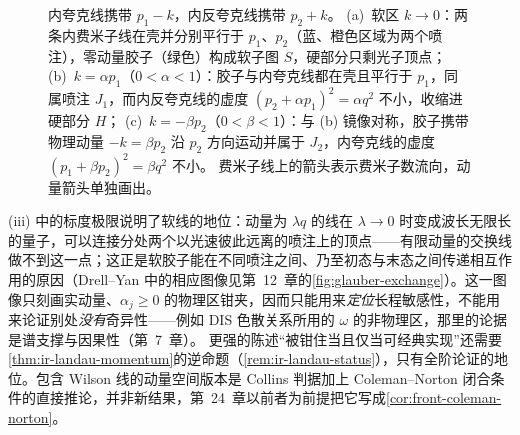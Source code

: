 \begin{figure}[htbp]
{内夸克线携带 $p_1-k$，内反夸克线携带 $p_2+k$。
(a)~软区 $k\to0$：两条内费米子线在壳并分别平行于 $p_1$、$p_2$（蓝、橙色区域为两个喷注），零动量胶子（绿色）构成软子图 $S$，硬部分只剩光子顶点；
(b)~$k=\alpha p_1$（$0<\alpha<1$）：胶子与内夸克线都在壳且平行于 $p_1$，同属喷注 $J_1$，而内反夸克线的虚度 $(p_2+\alpha p_1)^2=\alpha q^2$ 不小，收缩进硬部分 $H$；
(c)~$k=-\beta p_2$（$0<\beta<1$）：与 (b) 镜像对称，胶子携带物理动量 $-k=\beta p_2$ 沿 $p_2$ 方向运动并属于 $J_2$，内夸克线的虚度 $(p_1+\beta p_2)^2=\beta q^2$ 不小。
费米子线上的箭头表示费米子数流向，动量箭头单独画出。}
\label{fig:vertex-regions}
\end{figure}

(iii) 中的标度极限说明了软线的地位：动量为 $\lambda q$ 的线在 $\lambda\to0$ 时变成波长无限长的量子，可以连接分处两个以光速彼此远离的喷注上的顶点——有限动量的交换线做不到这一点；这正是软胶子能在不同喷注之间、乃至初态与末态之间传递相互作用的原因（Drell--Yan 中的相应图像见第~12~章的\cref{fig:glauber-exchange}）。这一图像只刻画实动量、$\alpha_j\ge0$ 的物理区钳夹，因而只能用来\emph{定位}长程敏感性，不能用来论证别处\emph{没有}奇异性——例如 DIS 色散关系所用的 $\omega$ 的非物理区，那里的论据是谱支撑与因果性（第~7~章）。%
更强的陈述“被钳住当且仅当可经典实现”还需要\cref{thm:ir-landau-momentum}的逆命题（\cref{rem:ir-landau-status}），只有全阶论证的地位。包含 Wilson 线的动量空间版本是 Collins 判据加上 Coleman--Norton 闭合条件的直接推论，并非新结果，第~24~章以前者为前提把它写成\cref{cor:front-coleman-norton}。
